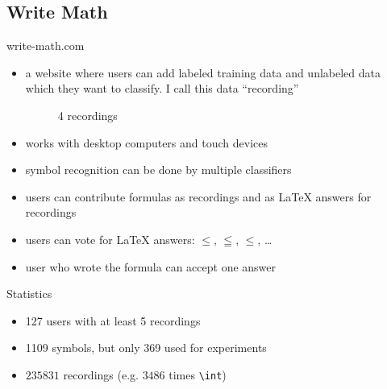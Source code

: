 \subsection{Write Math}

\begin{frame}{write-math.com}
    \begin{itemize}
        \item a website where users can add labeled training data and unlabeled
              data which they want to classify. I call this data \enquote{recording}
        \begin{figure}[ht]
            \centering
            \qquad
            \qquad
            \qquad
            \caption*{4 recordings}
        \end{figure}
        \item works with desktop computers and touch devices
        \item symbol recognition can be done by multiple classifiers
        \item users can contribute formulas as recordings and as \LaTeX{} answers
              for recordings
        \item users can vote for \LaTeX{} answers:
              \Large $\leq$, $\leqq$, $\leqslant$, \dots \normalsize
        \item user who wrote the formula can accept one answer
    \end{itemize}
\end{frame}



\begin{frame}[fragile]{Statistics}
    \begin{itemize}
        \item 127 users with at least 5 recordings
        \item 1109 symbols, but only 369 used for experiments
        \item $\num{235831}$ recordings (e.g. $\num{3486}$ times \verb+\int+)
    \end{itemize}
\end{frame}


